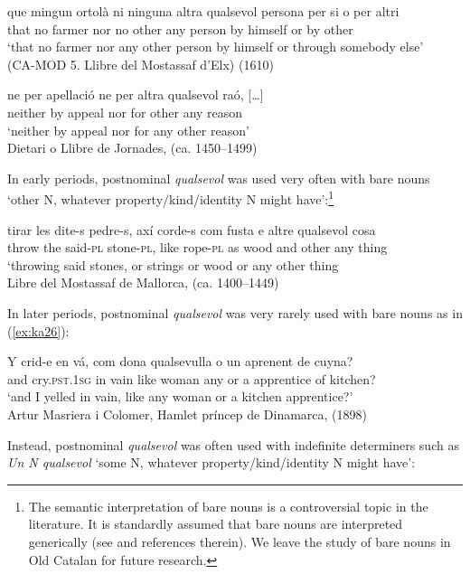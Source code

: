 \documentclass[output=paper,colorlinks,citecolor=brown]{langscibook}
\begin{document}
\ea \label{ex:ka23}
    \gll que mingun ortolà ni ninguna altra qualsevol persona per si o per altri\\
    that no farmer nor no other any person by himself or by other\\
    \glt ‘that no farmer nor any other person by himself or through somebody else’\\
    (CA-MOD 5. Llibre del Mostassaf d'Elx) (1610)
    
    \ex \label{ex:ka24} 
    \gll ne per apellació ne per altra qualsevol raó, […]\\
    neither by appeal nor for other any reason\\
    \glt ‘neither by appeal nor for any other reason’\\
    Dietari o Llibre de Jornades, (ca. 1450--1499)
\z

In early periods, postnominal \textit{qualsevol} was used very often with bare nouns ‘other N, whatever property/kind/identity N might have’:\footnote{The semantic interpretation of bare nouns is a controversial topic in the literature. It is standardly assumed that bare nouns are interpreted generically (see \cite{Zamparelli2000} and references therein). We leave the study of bare nouns in Old Catalan for future research.}

\ea \label{ex:ka25}
    \gll tirar les dite-s pedre-s, axí corde-s com fusta e altre qualsevol cosa\\
    throw the said-\textsc{pl} stone-\textsc{pl}, like rope-\textsc{pl} as wood and other any thing\\
    \glt ‘throwing said stones, or strings or wood or any other thing\\
    Libre del Mostassaf de Mallorca, (ca. 1400--1449)
\z

In later periods, postnominal \textit{qualsevol} was very rarely used with bare nouns as in (\ref{ex:ka26}):

\ea \label{ex:ka26}
    \gll Y crid-e en vá, com dona qualsevulla o un aprenent de cuyna?\\
    and cry.\textsc{pst.1sg} in vain like woman any or a apprentice of kitchen?\\
    \glt ‘and I yelled in vain, like any woman or a kitchen apprentice?’\\
     Artur Masriera i Colomer, Hamlet príncep de Dinamarca, (1898)
\z

Instead, postnominal \textit{qualsevol} was often used with indefinite determiners such as \textit{Un N qualsevol} ‘some N, whatever property/kind/identity N might have’:
\end{document}

